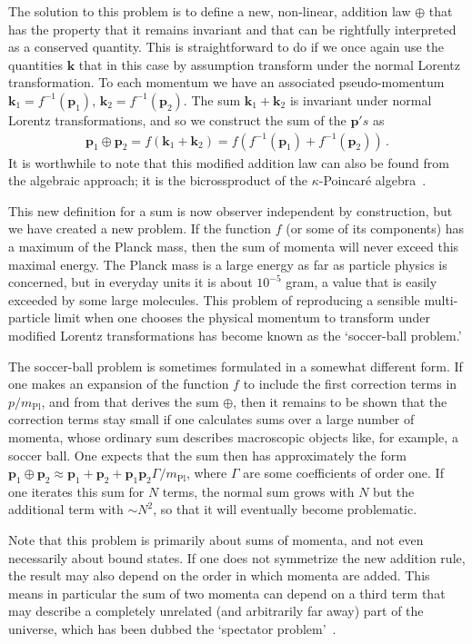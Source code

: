 \documentclass{article}
\def\beqn{\begin{eqnarray}}
\def\eeqn{\end{eqnarray}}
\begin{document}
The solution to this problem is to define a new,
non-linear, addition law $\oplus$ that has the property that it remains invariant and that can be rightfully
interpreted as a conserved quantity. This
is straightforward to do if we once again use the quantities $\mathbf{k}$ that in this case by 
assumption transform under the normal Lorentz transformation. To each momentum we have an associated 
pseudo-momentum $\mathbf{k}_1 = f^{-1}(\mathbf{p}_1)$,
 $\mathbf{k}_2 = f^{-1}(\mathbf{p}_2)$. The sum $\mathbf{k}_1 + \mathbf{k}_2$ is invariant under normal 
Lorentz transformations, and so we construct the sum of the $\mathbf{p}'s$ as
\beqn
\mathbf{p}_1 \oplus \mathbf{p}_2 = f(\mathbf{k}_1 + \mathbf{k}_2) =   f(f^{-1}(\mathbf{p}_1) + f^{-1}(\mathbf{p}_2)) \,.
\eeqn
It is worthwhile to note that this modified addition law can also be found from the algebraic approach; it
is the bicrossproduct of the $\kappa$-Poincar\'e algebra~\cite{KowalskiGlikman:2003we}.

This new definition for a sum is now observer independent by construction, but we have created a new problem. 
If the function $f$ (or some of its components) has a maximum of the Planck mass, then the sum of
momenta will never exceed this maximal energy. The Planck mass is a large energy as far as
particle physics is concerned, but in everyday units it is about $10^{-5}$ gram, a
value that is easily exceeded by some large molecules. This problem of reproducing a
sensible multi-particle limit when one chooses the physical momentum to transform under modified
Lorentz transformations has become known as the `soccer-ball problem.'

The soccer-ball problem is sometimes formulated in a somewhat different form. If one makes an expansion 
of the function $f$ to include the first correction terms in $p/m_{\mathrm{Pl}}$, and from that derives
the sum $\oplus$, then it remains to be shown that the correction terms stay small if one
calculates sums over a large number of momenta, whose ordinary sum describes macroscopic
objects like, for example, a soccer ball. One expects that the sum then has approximately the form
$\mathbf{p}_1 \oplus \mathbf{p}_2 \approx \mathbf{p}_1 + \mathbf{p}_2 + \mathbf{p}_1 \mathbf{p}_2 \Gamma/m_{\mathrm{Pl}}$,
where $\Gamma$ are some coefficients of order one. If one iterates this sum for $N$ terms, the
normal sum grows with $N$ but the additional term with $\sim N^2$, so that it will eventually
become problematic. 

Note that this problem is primarily about sums of momenta, and not even necessarily about 
bound states. If one does not symmetrize the new
addition rule, the result may also depend on the order in which momenta are added. 
This means in particular the sum of two momenta can depend on a third term that may
describe a completely unrelated (and arbitrarily far away) part of the universe, which
has been dubbed the `spectator problem'~\cite{KowalskiGlikman:2004qa,Girelli:2004ue}. 
\end{document}
